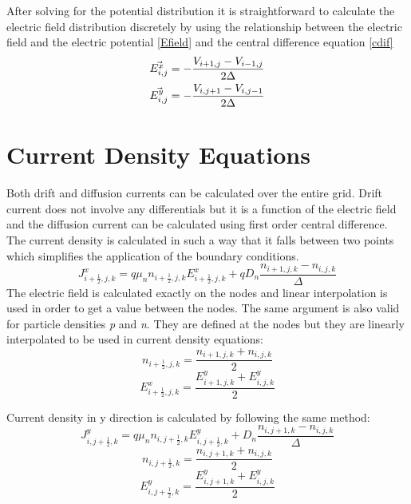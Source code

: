 \begin{doublespace}
After solving for the potential distribution it is straightforward to calculate the electric field distribution discretely by using the relationship between the electric field and the electric potential \eqref{Efield} and the central difference equation \eqref{cdif} 
\begin{eqnarray}
\vec{E^x_{i,j}}&=-\frac{V_{i+1,j}-V_{i-1,j}}{2\Delta}\\
\vec{\textcolor{black}{E^y_{i,j}}}&=-\frac{V_{i,j+1}-V_{i,j-1}}{2\Delta}
\end{eqnarray}

\clearpage
\section{Current Density Equations}
 Both drift and diffusion currents can be calculated over the entire grid. Drift current does not involve any differentials but it is a function of the electric field and the diffusion current can be calculated using first order central difference\cite{Dragica1}. The current density is calculated in such a way that it falls between two points which simplifies the application of the boundary conditions. 
\begin{equation}
J^x_{i+\frac{1}{2},j,k}=q\mu_n n_{i+\frac{1}{2},j,k} E^x_{i+\frac{1}{2},j,k}+q D_n \frac{n_{i+1,j,k}-n_{i,j,k}}{\Delta}
\end{equation}
The electric field is calculated exactly on the nodes and linear interpolation is used in order to get a value between the nodes. The same argument is also valid for particle densities \textit{p} and \textit{n}. They are defined at the nodes but they are linearly interpolated to be used in current density equations:
\begin{equation}\nonumber
n_{i+\frac{1}{2},j,k}=\frac{n_{i+1,j,k}+n_{i,j,k}}{2}
\end{equation}
\begin{equation}\nonumber
E^{x}_{i+\frac{1}{2},j,k}=\frac{E^y_{i+1,j,k}+E^y_{i,j,k}}{2}
\end{equation}

Current density in y direction is calculated by following the same method:
\begin{equation}
J^y_{i,j+\frac{1}{2},k}=q\mu_n n_{i,j+\frac{1}{2},k} E^y_{i,j+\frac{1}{2},k}+D_n \frac{n_{i,j+1,k}-n_{i,j,k}}{\Delta}
\end{equation}
\begin{equation}\nonumber
n_{i,j+\frac{1}{2},k}=\frac{n_{i,j+1,k}+n_{i,j,k}}{2}
\end{equation}
\begin{equation}\nonumber
E^{y}_{i,j+\frac{1}{2},k}=\frac{E^y_{i,j+1,k}+E^y_{i,j,k}}{2}
\end{equation}



\end{doublespace}
